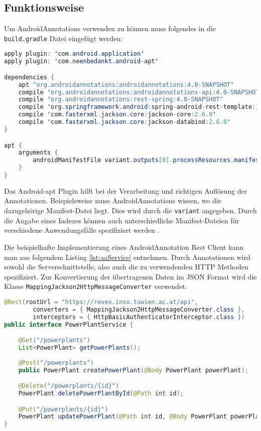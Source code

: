 \subsection{Funktionsweise}

Um AndroidAnnotations verwenden zu können muss folgendes in die \texttt{build.gradle} Datei eingefügt werden:

\begin{lstlisting}[language=java,label=dependenciesAA,stringstyle=\color{mymauve}\scriptsize, numbers=none, frame=single]
apply plugin: 'com.android.application'
apply plugin: 'com.neenbedankt.android-apt'

dependencies {
	apt "org.androidannotations:androidannotations:4.0-SNAPSHOT"
	compile "org.androidannotations:androidannotations-api:4.0-SNAPSHOT"
	compile "org.androidannotations:rest-spring:4.0-SNAPSHOT"
	compile 'org.springframework.android:spring-android-rest-template:1.0.1.RELEASE'
	compile 'com.fasterxml.jackson.core:jackson-core:2.6.0'
	compile 'com.fasterxml.jackson.core:jackson-databind:2.6.0'
}

apt {
	arguments {
		androidManifestFile variant.outputs[0].processResources.manifestFile
	}
}
\end{lstlisting}

Das Android-apt Plugin hilft bei der Verarbeitung und richtigen Auflösung der Annotationen. Beispielsweise muss AndroidAnnotations wissen, wo die dazugehörige Manifest-Datei liegt. Dies wird durch die  \texttt{variant} angegeben. Durch die Angabe eines Indexes können auch unterschiedliche Manifest-Dateien für verschiedene Anwendungsfälle spezifiziert werden \cite{android:apt}.

\newpage
Die beispielhafte Implementierung eines AndroidAnnotation Rest Client kann man aus folgendem Listing \ref{lst:aaService} entnehmen. Durch Annotationen wird sowohl die Serverschnittstelle, also auch die zu verwendenden HTTP Methoden spezifiziert. Zur Konvertierung der übertragenen Daten im JSON Format wird die Klasse \texttt{MappingJackson2HttpMessageConverter} verwendet.

\begin{lstlisting}[language=java, caption={Auszug aus dem PowerPlantService Interface},label={lst:aaService}, escapechar=|, frame=single]
@Rest(rootUrl = "https://revex.inso.tuwien.ac.at/api",
		converters = { MappingJackson2HttpMessageConverter.class },
		interceptors = { HttpBasicAuthenticatorInterceptor.class })
public interface PowerPlantService {

	@Get("/powerplants")
	List<PowerPlant> getPowerPlants();
	
	@Post("/powerplants")
	public PowerPlant createPowerPlant(@Body PowerPlant powerPlant);

	@Delete("/powerplants/{id}")
	PowerPlant deletePowerPlantById(@Path int id);

	@Put("/powerplants/{id}")
	PowerPlant updatePowerPlant(@Path int id, @Body PowerPlant powerPlant);
}
\end{lstlisting}

